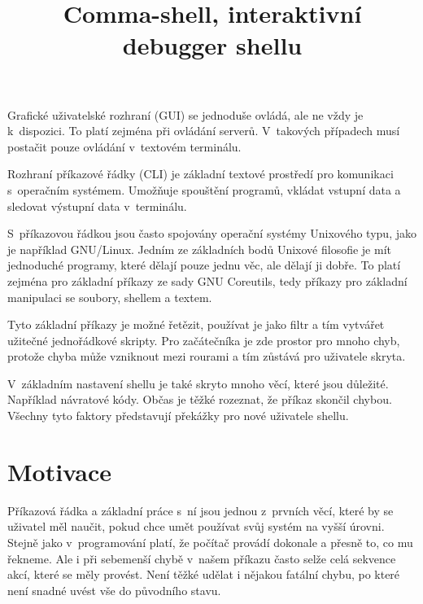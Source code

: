 \documentclass[thesis=M,czech]{FITthesis}[2012/06/26]
\title{Comma-shell, interaktivní debugger shellu}
\begin{document}
\lstset{basicstyle=\footnotesize\ttfamily,breaklines=true,showstringspaces=false,captionpos=b}
\renewcommand{\lstlistingname}{Ukázka}




\begin{introduction}


Grafické uživatelské rozhraní (GUI) se jednoduše ovládá, ale ne vždy je k~dispozici. To platí zejména při ovládání serverů. V~takových případech musí postačit pouze ovládání v~textovém terminálu.

Rozhraní příkazové řádky (CLI) je základní textové prostředí pro komunikaci s~operačním systémem. Umožňuje spouštění programů, vkládat vstupní data a sledovat výstupní data v~terminálu.

S~příkazovou řádkou jsou často spojovány operační systémy Unixového typu, jako je například GNU/Linux. Jedním ze základních bodů Unixové filosofie je mít jednoduché programy, které dělají pouze jednu věc, ale dělají ji dobře. To platí zejména pro základní příkazy ze sady GNU Coreutils, tedy příkazy pro základní manipulaci se soubory, shellem a textem.

Tyto základní příkazy je možné řetězit, používat je jako filtr a tím vytvářet užitečné jednořádkové skripty. Pro začátečníka je zde prostor pro mnoho chyb, protože chyba může vzniknout mezi rourami a tím zůstává pro uživatele skryta.

V~základním nastavení shellu je také skryto mnoho věcí, které jsou důležité. Například návratové kódy. Občas je těžké rozeznat, že příkaz skončil chybou. Všechny tyto faktory představují překážky pro nové uživatele shellu.


\section{Motivace}

Příkazová řádka a základní práce s~ní jsou jednou z~prvních věcí, které by se uživatel měl naučit, pokud chce umět používat svůj systém na vyšší úrovni. Stejně jako v~programování platí, že počítač provádí dokonale a přesně to, co mu řekneme. Ale i při sebemenší chybě v~našem příkazu často selže celá sekvence akcí, které se měly provést. Není těžké udělat i nějakou fatální chybu, po které není snadné uvést vše do původního stavu.


\end{introduction}
\end{document}
